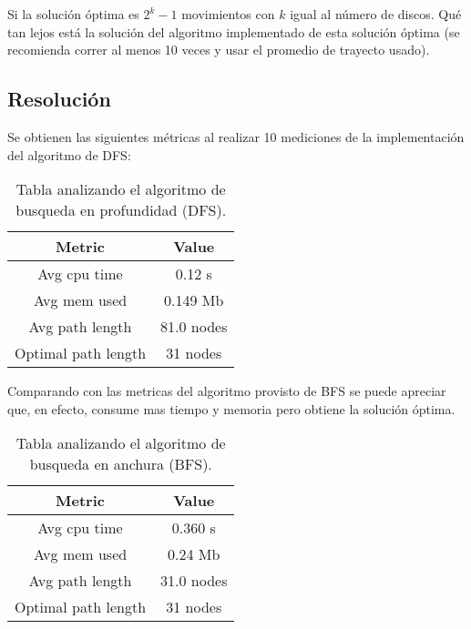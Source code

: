 \documentclass[12pt]{article}
\begin{document}
Si la solución óptima es $2^k - 1$ movimientos con $k$ igual al número de discos. Qué tan lejos está la solución 
del algoritmo implementado de esta solución óptima (se recomienda correr al menos 10 veces y usar el promedio de 
trayecto usado).

\subsection*{Resolución}

\vspace{0.1in}
Se obtienen las siguientes métricas al realizar 10 mediciones de la implementación del algoritmo de DFS: \\
\begin{table}[h]
  \caption{Tabla analizando el algoritmo de busqueda en profundidad (DFS).}
  \begin{tabular}{|c|c|}
    Metric & Value \\
    \hline
    Avg cpu time & 0.12 s \\
    Avg mem used & 0.149 Mb \\
    Avg path length & 81.0 nodes \\
    Optimal path length & 31 nodes \\
   \end{tabular}
\end{table}

Comparando con las metricas del algoritmo provisto de BFS se puede apreciar que, en efecto, consume mas tiempo y memoria pero obtiene la solución óptima.

\begin{table}[h]
  \caption{Tabla analizando el algoritmo de busqueda en anchura (BFS).}
  \begin{tabular}{|c|c|}
    Metric & Value \\
    \hline
    Avg cpu time & 0.360 s \\
    Avg mem used & 0.24 Mb \\
    Avg path length & 31.0 nodes \\
    Optimal path length & 31 nodes \\
  \end{tabular}
\end{table}

\newpage
\end{document}
